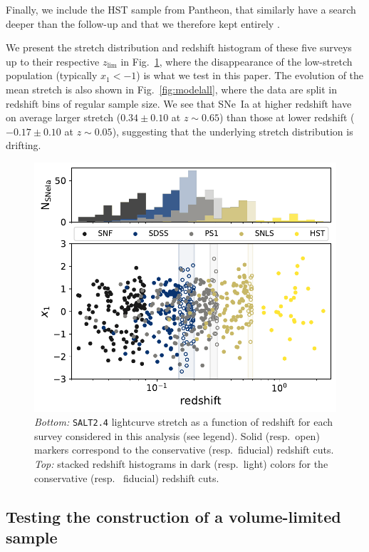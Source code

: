 \documentclass[]{aa}
\newcommand{\nn}[1]{\textcolor[rgb]{0.25, 0.50, 0}{#1}}
\begin{document}
Finally, we include the HST sample from Pantheon, that similarly have a search
deeper than the follow-up and that we therefore kept entirely
\citep{strolger04}.

We present the stretch distribution and redshift histogram of these five surveys
up to their respective $z_{\lim}$ in Fig.~\ref{fig:sample}, \nn{where the
disappearance of the low-stretch population (typically $x_1 < -1$) is what we
test in this paper}. The evolution of the mean stretch is also shown in
Fig.~\ref{fig:modelall}, where the data are split in redshift bins of regular
sample size. We see that SNe~Ia at higher redshift have on average larger
stretch ($0.34 \pm 0.10$ at $z\sim0.65$) than those at lower redshift ($-0.17\pm
0.10$ at $z\sim0.05$), suggesting that the underlying stretch distribution is
drifting.

\begin{figure}
    \centering
    \includegraphics[width=0.95\linewidth]{Article_figures/stretchs-cut_btw_hist_stac_75-lb-cividis.pdf}
    \caption{\textit{Bottom:} \textsc{\texttt{SALT2.4}} lightcurve stretch as a
        function of redshift for each survey considered in this analysis (see
        legend). Solid (resp.\ open) markers correspond to the conservative
        (resp.\ fiducial) redshift cuts. \textit{Top:} stacked redshift
        histograms in dark (resp.\ light) colors for the conservative (resp.
        \ fiducial) redshift cuts.}
    \label{fig:sample}
\end{figure}

\subsection{Testing the construction of a volume-limited sample}\label{ssec:verify}
\end{document}
